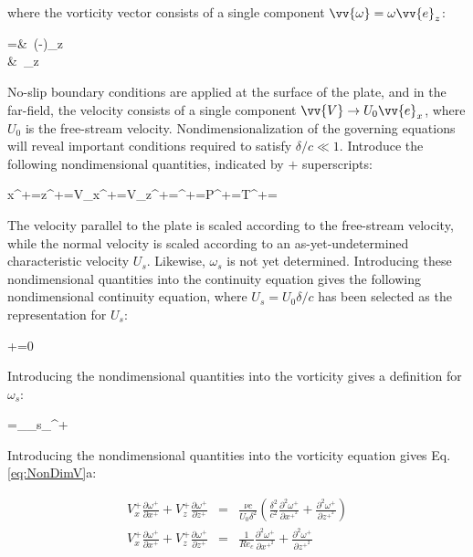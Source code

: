 \documentclass[10pt]{article}
\numberwithin{equation}{section} %
\begin{document}
where the vorticity vector consists of a single component \(\vv{\omega}=\omega\vv{e}_z\):

\beqa
\vv{\omega}=&\ \left(-\right)_z\\
\equiv&\ \omega{}_z
\eeqa

No-slip boundary conditions are applied at the surface of the plate, and in the far-field, the velocity consists of a single component \(\vv{V}\rightarrow U_0\vv{e}_x\), where \(U_0\) is the free-stream velocity. Nondimensionalization of the governing equations will reveal important conditions required to satisfy \(\delta/c\ll 1\). Introduce the following nondimensional quantities, indicated by \(+\) superscripts:

\beq
x^+=\hspace{0.8cm}z^+=\hspace{0.8cm}V_x^+=\hspace{0.8cm}V_z^+=\hspace{0.8cm}\omega^+=\hspace{0.8cm}P^+=\hspace{0.8cm}T^+=
\eeq

The velocity parallel to the plate is scaled according to the free-stream velocity, while the normal velocity is scaled according to an as-yet-undetermined characteristic velocity \(U_s\). Likewise, \(\omega_s\) is not yet determined. Introducing these nondimensional quantities into the continuity equation gives the following nondimensional continuity equation, where \(U_s=U_0\delta/c\) has been selected as the representation for \(U_s\):

\beq
{}+=0
\eeq

Introducing the nondimensional quantities into the vorticity gives a definition for \(\omega_s\):

\beq
\label{eq:VorticityNonDim}
\omega=_{\omega_s}_{\omega^+}
\eeq

Introducing the nondimensional quantities into the vorticity equation gives Eq. \eqref{eq:NonDimV}a:

\begin{subequations}
\label{eq:NonDimV}
\begin{eqnarray}
V_x^+\frac{\partial\omega^+}{\partial x^+}+V_z^+\frac{\partial \omega^+}{\partial z^+}&=&\frac{\nu c}{U_0\delta ^2}\left(\frac{\delta^2}{c^2}\frac{\partial ^2\omega^+}{\partial x^{+^2}}+\frac{\partial^2\omega^+}{\partial z^{+^2}}\right)\\
V_x^+\frac{\partial\omega^+}{\partial x^+}+V_z^+\frac{\partial \omega^+}{\partial z^+}&=&\frac{1}{Re_c}\frac{\partial ^2\omega^+}{\partial x^{+^2}}+\frac{\partial^2\omega^+}{\partial z^{+^2}}
\end{eqnarray}
\end{subequations}
\end{document}
